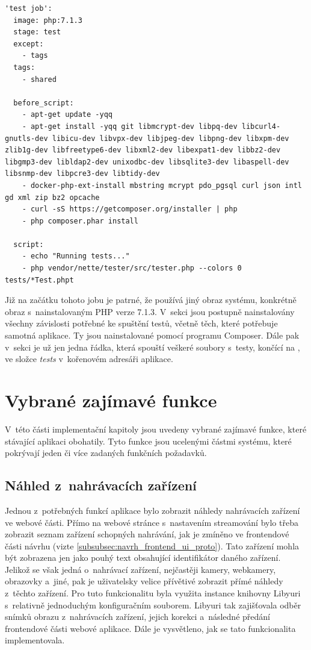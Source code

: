 \documentclass[thesis=M,czech]{FITthesis}[2012/06/26]
\begin{document}
\begin{lstlisting}[identifierstyle=\color{black}]
'test job':
  image: php:7.1.3
  stage: test
  except:
    - tags
  tags: 
    - shared

  before_script:
    - apt-get update -yqq
    - apt-get install -yqq git libmcrypt-dev libpq-dev libcurl4-gnutls-dev libicu-dev libvpx-dev libjpeg-dev libpng-dev libxpm-dev zlib1g-dev libfreetype6-dev libxml2-dev libexpat1-dev libbz2-dev libgmp3-dev libldap2-dev unixodbc-dev libsqlite3-dev libaspell-dev libsnmp-dev libpcre3-dev libtidy-dev
    - docker-php-ext-install mbstring mcrypt pdo_pgsql curl json intl gd xml zip bz2 opcache
    - curl -sS https://getcomposer.org/installer | php
    - php composer.phar install

  script:
    - echo "Running tests..."
    - php vendor/nette/tester/src/tester.php --colors 0 tests/*Test.phpt
\end{lstlisting}

Již na začátku tohoto jobu je patrné, že používá jiný obraz systému, konkrétně obraz s~nainstalovaným PHP verze 7.1.3. V~sekci  jsou postupně nainstalovány všechny závislosti potřebné ke spuštění testů, včetně těch, které potřebuje samotná aplikace. Ty jsou nainstalované pomocí programu Composer. Dále pak v~sekci  je už jen jedna řádka, která spouští veškeré soubory s~testy, končící na , ve složce \textit{tests} v~kořenovém adresáři aplikace.

\section{Vybrané zajímavé funkce} \label{sec:impl_funkce}
V~této části implementační kapitoly jsou uvedeny vybrané zajímavé funkce, které stávající aplikaci obohatily. Tyto funkce jsou ucelenými částmi systému, které pokrývají jeden či více zadaných funkčních požadavků.

\subsection{Náhled z~nahrávacích zařízení} \label{subsec:impl_funkce_preview}
Jednou z~potřebných funkcí aplikace bylo zobrazit náhledy nahrávacích zařízení ve webové části. Přímo na webové stránce s~nastavením streamování bylo třeba zobrazit seznam zařízení schopných nahrávání, jak je zmíněno ve frontendové části návrhu (vizte \ref{subsubsec:navrh_frontend_ui_proto}). Tato zařízení mohla být zobrazena jen jako pouhý text obsahující identifikátor daného zařízení. Jelikož se však jedná o~nahrávací zařízení, nejčastěji kamery, webkamery, obrazovky a~jiné, pak je uživatelsky velice přívětivé zobrazit přímé náhledy z~těchto zařízení. Pro tuto funkcionalitu byla využita instance knihovny Libyuri s~relativně jednoduchým konfiguračním souborem. Libyuri tak zajišťovala odběr snímků obrazu z~nahrávacích zařízení, jejich korekci a~následné předání frontendové části webové aplikace. Dále je vysvětleno, jak se tato funkcionalita implementovala. 
\end{document}
